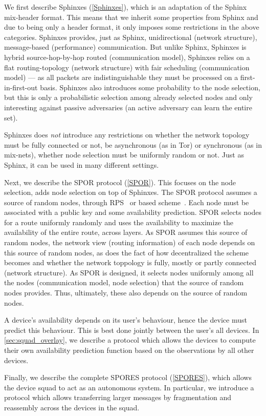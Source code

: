 We first describe Sphinxes (\cref{Sphinxes}), which is an adaptation of the 
Sphinx~\cite{Sphinx} mix-header format.
This means that we inherit some properties from Sphinx and due to being only a 
header format, it only imposes some restrictions in the above categories.
Sphinxes provides, just as Sphinx, unidirectional (network structure), 
message-based (performance) communication.
But unlike Sphinx, Sphinxes is hybrid source-hop-by-hop routed (communication 
model),
Sphinxes relies on a flat routing-topology (network structure) with fair 
scheduling (communication model) --- as all packets are indistinguishable they 
must be processed on a first-in-first-out basis.
Sphinxes also introduces some probability to the node selection, but this is 
only a probabilistic selection among already selected nodes and only 
interesting against passive adversaries (an active adversary can learn the 
entire set).

Sphinxes does \emph{not} introduce any restrictions on whether the network 
topology must be fully connected or not, be asynchronous (as in Tor) or 
synchronous (as in mix-nets), whether node selection must be uniformly random 
or not.
Just as Sphinx, it can be used in many different settings.

Next, we describe the \ac{SPOR} protocol (\cref{SPOR}).
This focuses on the node selection, \ie adds node selection on top of Sphinxes.
The \ac{SPOR} protocol assumes a source of random nodes, \eg through 
\ac{RPS}~\cite[\eg][]{} or  based scheme~\cite[\eg][]{}.
Each node must be associated with a public key and some availability 
prediction.
\Ac{SPOR} selects nodes for a route uniformly randomly and uses the 
availability to maximize the availability of the entire route, \ie across 
layers.
As \ac{SPOR} assumes this source of random nodes, the network view (routing 
information) of each node depends on this source of random nodes, as does the 
fact of how decentralized the scheme becomes and whether the network toppology 
is fully, mostly or partly connected (network structure).
As \ac{SPOR} is designed, it selects nodes uniformly among all the nodes 
(communication model, node selection) that the source of random nodes provides.
Thus, ultimately, these also depends on the source of random nodes.

A device's availability depends on its user's behaviour, hence the device must 
predict this behaviour.
This is best done jointly between the user's all devices.
In \cref{sec:squad_overlay}, we describe a protocol which allows the devices to 
compute their own availability prediction function based on the observations by 
all other devices.

Finally, we describe the complete \ac{SPORES} protocol (\cref{SPORES}), which 
allows the device squad to act as an autonomous system.
In particular, we introduce a protocol which allows transferring larger 
messages by fragmentation and reassembly across the devices in the squad.






